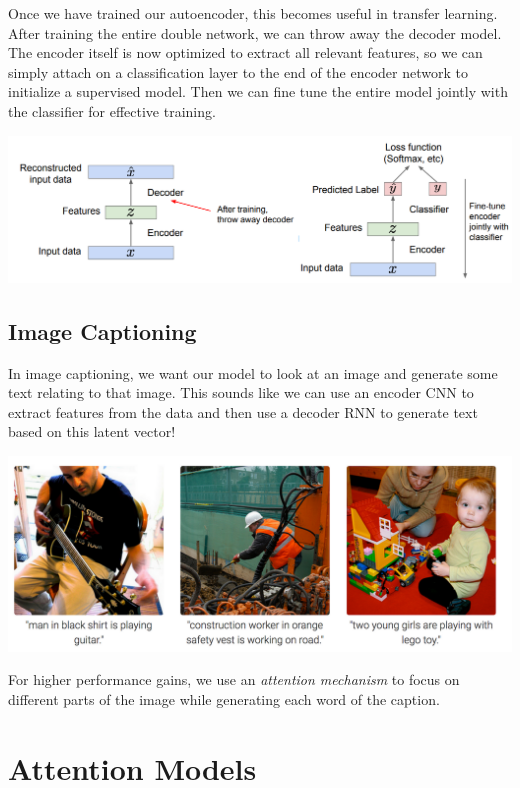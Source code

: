 \documentclass{article}
\theoremstyle{definition}
\theoremstyle{remark}
\theoremstyle{definition}
\begin{document}
Once we have trained our autoencoder, this becomes useful in transfer learning. After training the entire double network, we can throw away the decoder model. The encoder itself is now optimized to extract all relevant features, so we can simply attach on a classification layer to the end of the encoder network to initialize a supervised model. Then we can fine tune the entire model jointly with the classifier for effective training. 
\begin{center}
    \includegraphics[scale=0.33]{Images/transfer_autoencoder.png}
\end{center}

\subsection{Image Captioning}

In image captioning, we want our model to look at an image and generate some text relating to that image. This sounds like we can use an encoder CNN to extract features from the data and then use a decoder RNN to generate text based on this latent vector! 
\begin{center}
    \includegraphics[scale=0.3]{Images/image_captioning.png}
\end{center}
For higher performance gains, we use an \textit{attention mechanism} to focus on different parts of the image while generating each word of the caption. 


\section{Attention Models}
\end{document}
